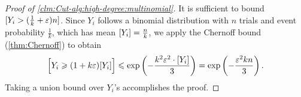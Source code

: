\documentclass[11pt,fleqn]{article}
\renewcommand{\geq}{\geqslant}
\renewcommand{\leq}{\leqslant}
\renewcommand{\epsilon}{\varepsilon}
\let\E\relax\DeclareMathOperator*{\E}{\mathbb{E}}  \let\Pr\relax\DeclareMathOperator*{\Pr}{\mathbb{Pr}}
\let\Pr\relax\DeclareMathOperator*{\Pr}{\mathbb{P}}
\theoremstyle{definition}
\numberwithin{equation}{section}
\begin{document}
\begin{proof}[Proof of \cref{clm:Cut-alg:high-degree:multinomial}]
It is sufficient to bound
$\Pr[Y_i > (\frac{1}{k}+\epsilon)n]$.
Since $Y_i$ follows a binomial distribution with $n$ trials and event probability $\frac{1}{k}$,
which has mean $\E[Y_i] = \frac{n}{k}$,
we apply the Chernoff bound (\cref{thm:Chernoff}) to obtain
\begin{align}
    \Pr\Bigl[Y_i \geq (1+k\epsilon) \E[Y_i] \Bigr]
    \leq \exp\left(-\frac{k^2\epsilon^2 \cdot \E[Y_i]}{3}\right)
    = \exp\left(-\frac{\epsilon^2 k n}{3}\right).
\end{align}
Taking a union bound over $Y_i$'s accomplishes the proof.
\end{proof}
\end{document}

